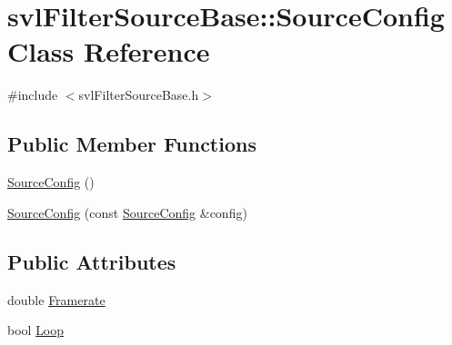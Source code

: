 \hypertarget{classsvl_filter_source_base_1_1_source_config}{\section{svl\-Filter\-Source\-Base\-:\-:Source\-Config Class Reference}
\label{classsvl_filter_source_base_1_1_source_config}
}


{\ttfamily \#include $<$svl\-Filter\-Source\-Base.\-h$>$}

\subsection*{Public Member Functions}
\begin{DoxyCompactItemize}
\item 
\hyperlink{classsvl_filter_source_base_1_1_source_config_ac543d1114f71dcf851fcaa3dbe81fc76}{Source\-Config} ()
\item 
\hyperlink{classsvl_filter_source_base_1_1_source_config_a17c50fc4a717d3910222a5e96f838a86}{Source\-Config} (const \hyperlink{classsvl_filter_source_base_1_1_source_config}{Source\-Config} \&config)
\end{DoxyCompactItemize}
\subsection*{Public Attributes}
\begin{DoxyCompactItemize}
\item 
double \hyperlink{classsvl_filter_source_base_1_1_source_config_aa91946e246f802e4fdf7691e6a3c9fa6}{Framerate}
\item 
bool \hyperlink{classsvl_filter_source_base_1_1_source_config_aab00181cb4a94ee89f364f50597f7c9e}{Loop}
\end{DoxyCompactItemize}


